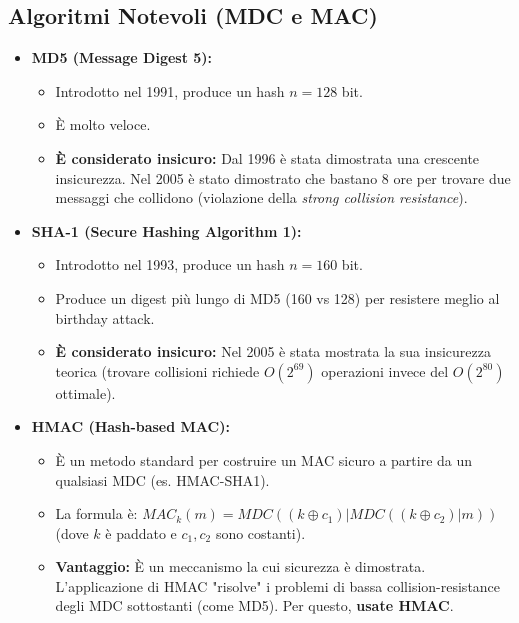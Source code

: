 \documentclass[../main.tex]{subfiles}
\begin{document}
\subsection{Algoritmi Notevoli (MDC e MAC)}
\begin{itemize}
	\item \textbf{MD5 (Message Digest 5):}
	      \begin{itemize}
	      	\item Introdotto nel 1991, produce un hash $n=128$ bit.
	      	\item È molto veloce.
	      	\item \textbf{È considerato insicuro:} Dal 1996 è stata dimostrata una crescente insicurezza. Nel 2005 è stato dimostrato che bastano 8 ore per trovare due messaggi che collidono (violazione della \emph{strong collision resistance}).
	      \end{itemize}
	\item \textbf{SHA-1 (Secure Hashing Algorithm 1):}
	      \begin{itemize}
	      	\item Introdotto nel 1993, produce un hash $n=160$ bit.
	      	\item Produce un digest più lungo di MD5 (160 vs 128) per resistere meglio al birthday attack.
	      	\item \textbf{È considerato insicuro:} Nel 2005 è stata mostrata la sua insicurezza teorica (trovare collisioni richiede $O(2^{69})$ operazioni invece del $O(2^{80})$ ottimale).
	      \end{itemize}
	\item \textbf{HMAC (Hash-based MAC):}
	      \begin{itemize}
	      	\item È un metodo standard per costruire un MAC sicuro a partire da un qualsiasi MDC (es. HMAC-SHA1).
	      	\item La formula è: $MAC_k(m) = MDC((k \oplus c_1) | MDC((k \oplus c_2) | m))$ (dove $k$ è paddato e $c_1, c_2$ sono costanti).
	      	\item \textbf{Vantaggio:} È un meccanismo la cui sicurezza è dimostrata. L'applicazione di HMAC "risolve" i problemi di bassa collision-resistance degli MDC sottostanti (come MD5). Per questo, \textbf{usate HMAC}.
	      \end{itemize}
\end{itemize}
\end{document}
